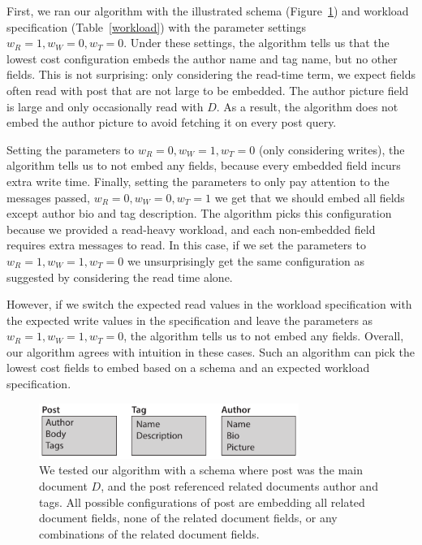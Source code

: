 First, we ran our algorithm with the illustrated schema (Figure~\ref{fig:schema}) and workload specification (Table~\ref{workload}) with the parameter settings $w_R = 1, w_W = 0, w_T = 0$. Under these settings, the algorithm tells us that the lowest cost configuration embeds the author name and tag name, but no other fields. 
This is not surprising: only considering the read-time term, we expect fields often read with post that are not large to be embedded. 
The author picture field is large and only occasionally read with $D$.
As a result, the algorithm does not embed the author picture to avoid fetching it on every post query.

Setting the parameters to $w_R = 0, w_W = 1, w_T = 0$ (only considering writes), the algorithm tells us to not embed any fields, because every embedded field incurs extra write time.
Finally, setting the parameters to only pay attention to the messages passed, $w_R = 0, w_W = 0, w_T = 1$ we get that we should embed all fields except author bio and tag description. 
The algorithm picks this configuration because we provided a read-heavy workload, and each non-embedded field requires extra messages to read. 
In this case, if we set the parameters to $w_R = 1, w_W = 1, w_T = 0$ we unsurprisingly get the same configuration as suggested by considering the read time alone. 

However, if we switch the expected read values in the workload specification with the expected write values in the specification and leave the parameters as  $w_R = 1, w_W = 1, w_T = 0$, the algorithm tells us to not embed any fields. %
Overall, our algorithm agrees with intuition in these cases. Such an algorithm can pick the lowest cost fields to embed based on a schema and an expected workload specification.

\begin{figure}[t]
\centering
\includegraphics[width=3.33in]{figures/algorithm-schema.pdf}
\caption{We tested our algorithm with a schema where post was the main document $D$, and the post referenced related documents author and tags. All possible configurations of post are embedding all related document fields, none of the related document fields, or any combinations of the related document fields.}
\label{fig:schema}
\end{figure}


